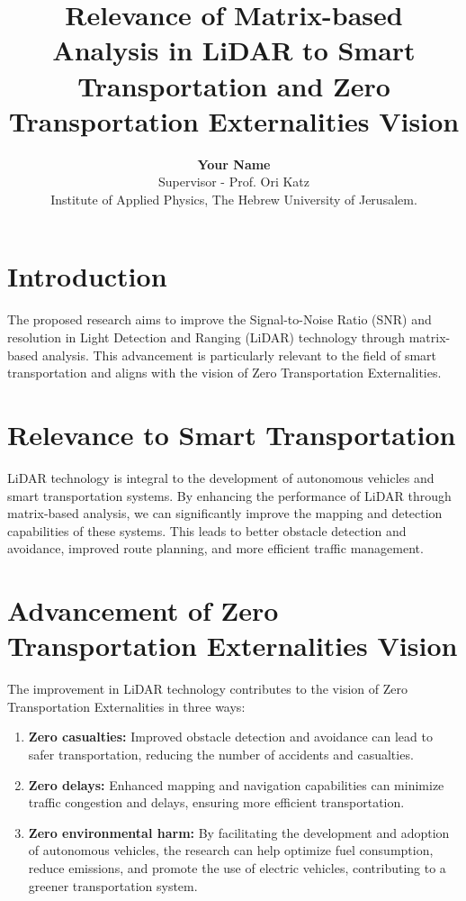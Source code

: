\documentclass{article}
\title{\textbf{\Large Relevance of Matrix-based Analysis in LiDAR to Smart Transportation and Zero Transportation Externalities Vision}}
\author{\textbf{Your Name} \\ Supervisor - Prof. Ori Katz \\ Institute of Applied Physics, The Hebrew University of Jerusalem.}
\begin{document}
\maketitle

\section{Introduction}
The proposed research aims to improve the Signal-to-Noise Ratio (SNR) and resolution in Light Detection and Ranging (LiDAR) technology through matrix-based analysis. This advancement is particularly relevant to the field of smart transportation and aligns with the vision of Zero Transportation Externalities.

\section{Relevance to Smart Transportation}
LiDAR technology is integral to the development of autonomous vehicles and smart transportation systems. By enhancing the performance of LiDAR through matrix-based analysis, we can significantly improve the mapping and detection capabilities of these systems. This leads to better obstacle detection and avoidance, improved route planning, and more efficient traffic management. 

\section{Advancement of Zero Transportation Externalities Vision}
The improvement in LiDAR technology contributes to the vision of Zero Transportation Externalities in three ways:

\begin{enumerate}
    \item \textbf{Zero casualties:} Improved obstacle detection and avoidance can lead to safer transportation, reducing the number of accidents and casualties.
    \item \textbf{Zero delays:} Enhanced mapping and navigation capabilities can minimize traffic congestion and delays, ensuring more efficient transportation.
    \item \textbf{Zero environmental harm:} By facilitating the development and adoption of autonomous vehicles, the research can help optimize fuel consumption, reduce emissions, and promote the use of electric vehicles, contributing to a greener transportation system.
\end{enumerate}
\end{document}
